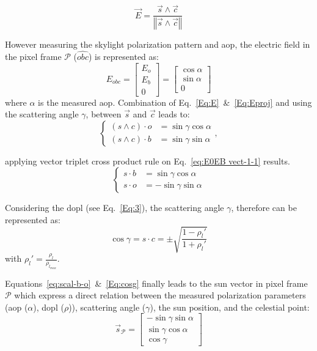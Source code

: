\begin{equation}
\vec{E}=\frac{\vec{s}\wedge \vec{c}}{\left\Vert \vec{s}\wedge
    \vec{c}\right\Vert }
\label{Eq:E}
\end{equation}

However measuring the skylight polarization pattern and \gls{aop}, the electric
field in the pixel frame $\mathcal{P}$ ($\widehat{obc}$) is represented as:
\begin{equation}
E_{obc}=\left[\begin{array}{l}
E_{o}\\
E_{b}\\
0
\end{array}\right]=\left[\begin{array}{l}
\cos\alpha\\
\sin\alpha\\
0
\end{array}\right]
\label{Eq:Eproj}
\end{equation}
\noindent where $\alpha$ is the measured \gls{aop}.
Combination of Eq.~\ref{Eq:E}~\&~\ref{Eq:Eproj} and using the
scattering angle $\gamma$, between $\vec{s}$ and $\vec{c}$ leads to:
\begin{equation}
  \begin{cases}
(s\wedge c)\cdot o & =\sin\gamma\cos\alpha\\
(s\wedge c)\cdot b & =\sin\gamma\sin\alpha
\end{cases},\label{eq:E0EB vect-1-1}
\end{equation}

\noindent applying vector triplet cross product rule on Eq.~\ref{eq:E0EB
  vect-1-1} results.
\begin{equation}
\begin{cases}
s\cdot b & =\sin\gamma\cos\alpha\\
s\cdot o & =-\sin\gamma\sin\alpha
\end{cases}\label{eq:scal-b-o}
\end{equation}

Considering the \gls{dopl} (see Eq.~\ref{Eq:3}), the scattering angle
$\gamma$, therefore can be represented as:
\begin{equation}
\cos\gamma=s\cdot c=\pm\sqrt{\frac{1-\rho_{l}'}{1+\rho_{l}'}}
\label{Eq:cosg}
\end{equation}
\noindent with $\rho_{l}'=\frac{\rho_{l}}{\rho_{l_{max}}}.$ \\
\vspace{0.4mm}

Equations~\ref{eq:scal-b-o}~\&~\ref{Eq:cosg} finally leads to the sun vector
in pixel frame $\mathcal{P}$ which express a direct relation between the
measured polarization parameters (\gls{aop} ($\alpha$), \gls{dopl} ($\rho$)),
scattering angle ($\gamma$), the sun position,  and the celestial point:
\begin{equation}
  \label{Eq:sunp}
  \vec{s}_{\mathcal{P}} =
  \left[
    \begin{array}{l}
    -\sin\gamma \sin\alpha\\
    \sin\gamma \cos\alpha\\
    \cos\gamma
  \end{array}
  \right]
\end{equation}

